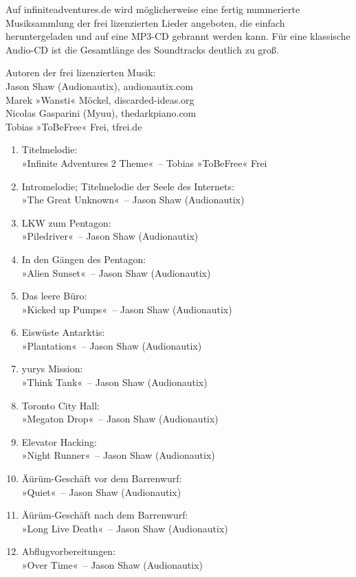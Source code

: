Auf infiniteadventures.de wird möglicherweise eine fertig nummerierte Musiksammlung der frei lizenzierten Lieder angeboten, die einfach heruntergeladen und auf eine MP3-CD gebrannt werden kann. Für eine klassische Audio-CD ist die Gesamtlänge des Soundtracks deutlich zu groß.

Autoren der frei lizenzierten Musik:\\
Jason Shaw (Audionautix), audionautix.com\\
Marek »Wansti« Möckel, discarded-ideas.org\\
Nicolas Gasparini (Myuu), thedarkpiano.com\\ %
Tobias »ToBeFree« Frei, tfrei.de

\begin{enumerate}
    \item Titelmelodie:\\ »Infinite Adventures 2 Theme«~– Tobias »ToBeFree« Frei
    \item Intromelodie; Titelmelodie der Seele des Internets:\\ »The Great Unknown«~– Jason Shaw (Audionautix)
    \item LKW zum Pentagon:\\ »Piledriver«~– Jason Shaw (Audionautix)
    \item In den Gängen des Pentagon:\\ »Alien Sunset«~– Jason Shaw (Audionautix)
    \item Das leere Büro:\\ »Kicked up Pumps«~– Jason Shaw (Audionautix)
    \item Eiswüste Antarktis:\\ »Plantation«~– Jason Shaw (Audionautix)
    \item yurys Mission:\\ »Think Tank«~– Jason Shaw (Audionautix)
    \item Toronto City Hall:\\ »Megaton Drop«~– Jason Shaw (Audionautix)
    \item Elevator Hacking:\\ »Night Runner«~– Jason Shaw (Audionautix)
    \item Äürüm-Geschäft vor dem Barrenwurf:\\ »Quiet«~– Jason Shaw (Audionautix)
    \item Äürüm-Geschäft nach dem Barrenwurf:\\ »Long Live Death«~– Jason Shaw (Audionautix)
    \item Abflugvorbereitungen:\\ »Over Time«~– Jason Shaw (Audionautix)

\end{enumerate}

